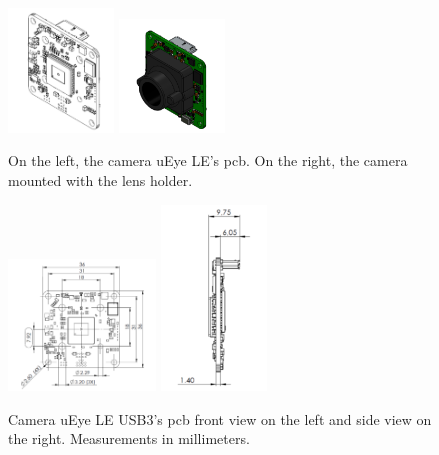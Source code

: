 \begin{figure}[ht]
	\centering
	\includegraphics[width=0.25\textwidth]{images/camview.png}
	\includegraphics[width=0.25\textwidth]{images/camwlens.png}
	\caption[Camera uEye LE USB3]{On the left, the camera uEye LE's \acrshort{pcb}. On the right, the camera mounted with the lens holder.}
	\label{appendix:cha2:camview}
\end{figure}

\begin{figure}[ht]
	\centering
	\includegraphics[width=0.35\textwidth]{images/camfronttview.png}
	\includegraphics[width=0.25\textwidth]{images/camsideview.png}
	\caption[Camera uEye LE USB3's \acrshort{pcb}]{Camera uEye LE USB3's \acrshort{pcb} front view on the left and side view on the right. Measurements in millimeters.}
	\label{appendix:cha2:camsides}
\end{figure}

